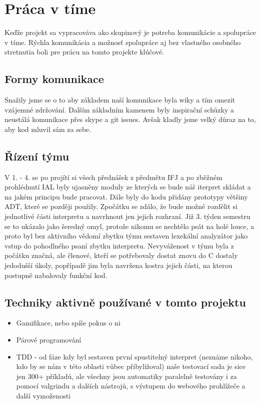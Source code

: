 \documentclass[a4paper]{article}
\begin{document}
\section{Práca v tíme}
Keďže projekt sa vypracováva ako skupinový je potreba komunikácie a spolupráce v tíme. Rýchla komunikácia a možnosť spolupráce aj bez vlastného osobného stretnutia boli pre prácu na tomto projekte klúčové.

\subsection{Formy komunikace}
Snažily jsme se o to aby základem naší komunikace byla wiky a tím omezit vzájemné zdržování. Dalším základním kamenem byly inspirační schůzky a neustálá komunikace přes skype a git issues. Avšak kladly jsme velký důraz na to, aby kod mluvil sám za sebe.

\subsection{Řízení týmu}
V 1. - 4. se po projítí si všech přednášek z předmětu IFJ a po zběžném prohlédnutí IAL byly ujasněny moduly ze kterých se bude náš iterpret skládat a na jakém principu bude pracovat. Dále byly do kodu přidány prototypy většiny ADT, které se později použily.
Zpočátku se zdálo, že bude možné rozdělit si jednotlivé části interpretu a navrhnout jen jejich rozhraní. Již 3. týden semestru se to ukázalo jako šeredný omyl, protože nikomu se nechtělo psát na holé louce, a proto byl bez aktivního vědomí zbytku týmu sestaven lexekální analyzátor jako vstup do pohodlného psaní zbytku interpretu. Nevyváženost v týmu byla z počátku značná, ale členové, kteří se potřebovaly dostat znovu do C dostaly jedodušší úkoly, popřípadě jim byla navržena kostra jejich části, na kterou postupně nabalovaly funkční kod.

\subsection{Techniky aktivně používané v tomto projektu}
\begin{itemize}
	\item Gamifikace, nebo spíše pokus o ni 
	\item Párové programování
	\item TDD - od fáze kdy byl sestaven první spustitelný interpret (neznáme nikoho, kdo by se nám v této oblasti vůbec přibyližoval) naše testovací sada je sice jen 300+ příkladů, ale všechny jsou automatiky paralelně testovány i za pomocí valgrindu a dalších nástrojů, s výstupem do webového prohlížeče a další vymoženosti
\end{itemize}
\end{document}
